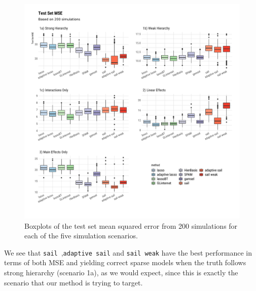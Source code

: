 \documentclass[12pt,letter]{article}\usepackage[]{graphicx}\usepackage[]{color}
\newenvironment{knitrout}{}{} %
\newcommand{\sail}{\texttt{sail}}
\begin{document}
\begin{knitrout}\scriptsize
{}\color{fgcolor}\begin{figure}[H]

{\centering \includegraphics[width=1\linewidth]{figure/plot-mse-sim-1} 

}

\caption[Boxplots of the test set mean squared error from 200 simulations for each of the five simulation scenarios]{Boxplots of the test set mean squared error from 200 simulations for each of the five simulation scenarios.}\label{fig:plot-mse-sim}
\end{figure}


\end{knitrout}

We see that \sail~,\texttt{adaptive sail} and \texttt{sail weak} have the best performance in terms of both MSE and yielding correct sparse models when the truth follows strong hierarchy (scenario 1a), as we would expect, since this is exactly the scenario that our method is trying to target. 
\end{document}
